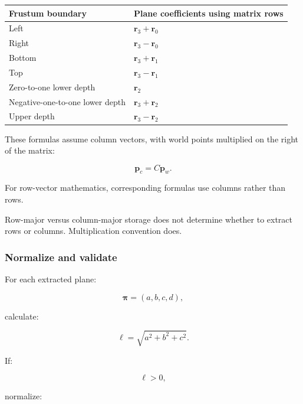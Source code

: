 {\def\LTcaptype{none} %
\begin{longtable}[]{@{}
  >{\raggedright\arraybackslash}p{}
  >{\raggedright\arraybackslash}p{}@{}}
\toprule\noalign{}
\begin{minipage}[b]{\linewidth}\raggedright
Frustum boundary
\end{minipage} & \begin{minipage}[b]{\linewidth}\raggedright
Plane coefficients using matrix rows
\end{minipage} \\
\midrule\noalign{}
\endhead
\bottomrule\noalign{}
\endlastfoot
Left & \(\mathbf r_3+\mathbf r_0\) \\
Right & \(\mathbf r_3-\mathbf r_0\) \\
Bottom & \(\mathbf r_3+\mathbf r_1\) \\
Top & \(\mathbf r_3-\mathbf r_1\) \\
Zero-to-one lower depth & \(\mathbf r_2\) \\
Negative-one-to-one lower depth & \(\mathbf r_3+\mathbf r_2\) \\
Upper depth & \(\mathbf r_3-\mathbf r_2\) \\
\end{longtable}
}

These formulas assume column vectors, with world points multiplied on the right of the matrix:

\[
 \mathbf p_c=C\mathbf p_w.
\]

For row-vector mathematics, corresponding formulas use columns rather than rows.

Row-major versus column-major storage does not determine whether to extract rows or columns. Multiplication convention does.

\subsubsection{Normalize and validate}\label{normalize-and-validate}

For each extracted plane:

\[
 \boldsymbol\pi=(a,b,c,d),
\]

calculate:

\[
 \ell=\sqrt{a^2+b^2+c^2}.
\]

If:

\[
 \ell>0,
\]

normalize:

